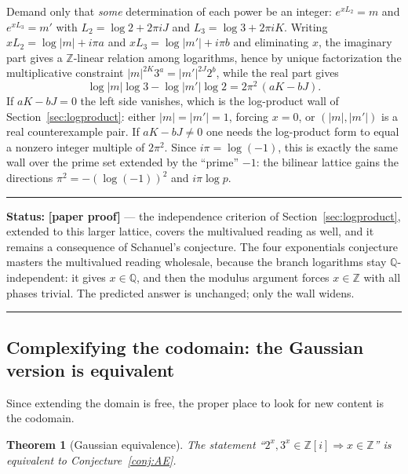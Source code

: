 \documentclass[11pt,oneside]{article}
\newtheorem{theorem}{Theorem}[section]
\theoremstyle{definition}
\theoremstyle{remark}
\newcommand{\Z}{\mathbb Z}
\newcommand{\Q}{\mathbb Q}
\newcommand{\statusnew}{\textcolor{newgreen}{\textbf{[paper proof]}}}
\newenvironment{statusbox}[1]
{\begin{center}\begin{minipage}{0.94\textwidth}\raggedright\hbadness=10000\hrule
\vspace{0.45em}\textbf{Status:} #1\par\vspace{0.35em}}
{\vspace{0.35em}\hrule\end{minipage}\end{center}}
\begin{document}
Demand only that \emph{some} determination of each power be an integer:
$e^{xL_2}=m$ and $e^{xL_3}=m'$ with $L_2=\log2+2\pi iJ$ and $L_3=\log3+2\pi iK$.  Writing
$xL_2=\log|m|+i\pi a$ and $xL_3=\log|m'|+i\pi b$ and eliminating $x$, the imaginary part gives
a $\Z$-linear relation among logarithms, hence by unique factorization the multiplicative
constraint $|m|^{2K}3^a=|m'|^{2J}2^b$, while the real part gives
\begin{equation}
  \log|m|\log3-\log|m'|\log2=2\pi^2\,(aK-bJ).
  \label{eq:va-branch}
\end{equation}
If $aK-bJ=0$ the left side vanishes, which is the log-product wall of
Section~\ref{sec:logproduct}: either $|m|=|m'|=1$, forcing $x=0$, or $(|m|,|m'|)$ is a real
counterexample pair.  If $aK-bJ\ne0$ one needs the log-product form to equal a nonzero integer
multiple of $2\pi^2$.  Since $i\pi=\log(-1)$, this is exactly the same wall over the prime set
extended by the ``prime'' $-1$: the bilinear lattice gains the directions
$\pi^2=-(\log(-1))^2$ and $i\pi\log p$.

\begin{statusbox}{\statusnew{} --- the independence criterion of
Section~\ref{sec:logproduct}, extended to this larger lattice, covers the multivalued reading
as well, and it remains a consequence of Schanuel's conjecture.  The four exponentials
conjecture masters the multivalued reading wholesale, because the branch logarithms stay
$\Q$-independent: it gives $x\in\Q$, and then the modulus argument forces $x\in\Z$ with all
phases trivial.  The predicted answer is unchanged; only the wall widens.}
\end{statusbox}

\subsection{Complexifying the codomain: the Gaussian version is equivalent}

Since extending the domain is free, the proper place to look for new content is the codomain.

\begin{theorem}[Gaussian equivalence]
\label{va:thm-gaussian}
The statement ``$2^x,3^x\in\Z[i]\Rightarrow x\in\Z$'' is equivalent to
Conjecture~\ref{conj:AE}.
\end{theorem}
\end{document}
